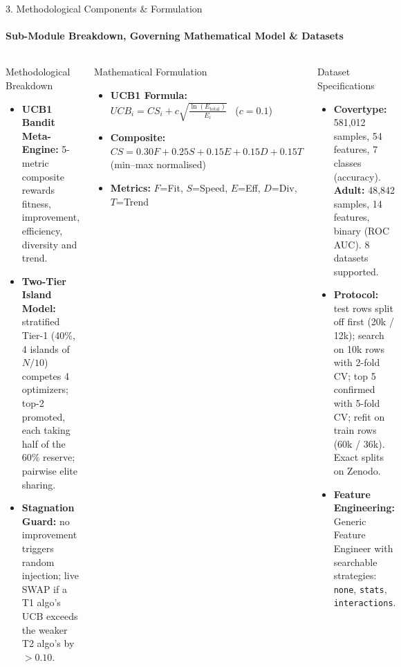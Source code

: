 \documentclass[aspectratio=169, 11pt]{beamer}
\begin{document}
\begin{frame}{3. Methodological Components \& Formulation}
    \framesubtitle{Sub-Module Breakdown, Governing Mathematical Model \& Datasets}
    \begin{columns}[T]
        \begin{block}{Methodological Breakdown}
            \scriptsize
            \begin{itemize}
                \setlength{\itemsep}{1pt}
                \item \textbf{UCB1 Bandit Meta-Engine:} 5-metric composite rewards fitness, improvement, efficiency, diversity and trend.
                \item \textbf{Two-Tier Island Model:} stratified Tier-1 (40\%, 4 islands of $N/10$) competes 4 optimizers; top-2 promoted, each taking half of the 60\% reserve; pairwise elite sharing.
                \item \textbf{Stagnation Guard:} no improvement triggers random injection; live SWAP if a T1 algo's UCB exceeds the weaker T2 algo's by $>0.10$.
            \end{itemize}
        \end{block}

        \begin{block}{Mathematical Formulation}
            \scriptsize
            \begin{itemize}
                \setlength{\itemsep}{1pt}
                \item \textbf{UCB1 Formula:} $UCB_i = CS_i + c\sqrt{\frac{\ln(E_{\text{total}})}{E_i}}$ \ ($c=0.1$)
                \item \textbf{Composite:} $CS = 0.30F + 0.25S + 0.15E + 0.15D + 0.15T$ (min--max normalised)
                \item \textbf{Metrics:} $F$=Fit, $S$=Speed, $E$=Eff, $D$=Div, $T$=Trend
            \end{itemize}
        \end{block}

        \begin{block}{Dataset Specifications}
            \scriptsize
            \begin{itemize}
                \setlength{\itemsep}{1pt}
                \item \textbf{Covertype:} 581,012 samples, 54 features, 7 classes (accuracy). \textbf{Adult:} 48,842 samples, 14 features, binary (ROC AUC). 8 datasets supported.
                \item \textbf{Protocol:} test rows split off first (20k / 12k); search on 10k rows with 2-fold CV; top 5 confirmed with 5-fold CV; refit on train rows (60k / 36k). Exact splits on Zenodo.
                \item \textbf{Feature Engineering:} Generic Feature Engineer with searchable strategies: \texttt{none}, \texttt{stats}, \texttt{interactions}.
            \end{itemize}
        \end{block}


\end{columns}
\end{frame}
\end{document}
